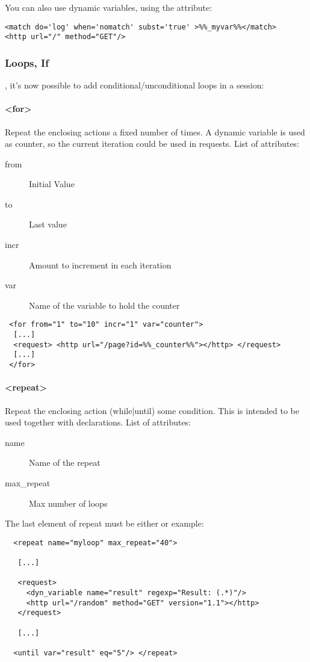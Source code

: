 \documentclass{TSUNG-en}
\begin{document}
You can also use dynamic variables, using the  attribute:
\begin{Verbatim}
<match do='log' when='nomatch' subst='true' >%%_myvar%%</match>
<http url="/" method="GET"/>
\end{Verbatim}

\subsubsection{Loops, If}

, it's now possible to add conditional/unconditional loops in a session:

\paragraph{<for>}


Repeat the enclosing actions a fixed number of times. A dynamic
variable is used as counter, so the current iteration could be used in
requests. List of attributes:

\begin{description}
\item[from] Initial Value
\item[to]   Last value
\item[incr] Amount to increment in each iteration
\item[var]  Name of the variable to hold the counter
\end{description}

\begin{Verbatim}
 <for from="1" to="10" incr="1" var="counter">
  [...]
  <request> <http url="/page?id=%%_counter%%"></http> </request>
  [...]
 </for>
\end{Verbatim}

\paragraph{<repeat>}
Repeat the enclosing action (while|until) some condition. This is
intended to be used together with  declarations. List of
attributes:

\begin{description}
\item[name] Name of the repeat
\item[max\_repeat] Max number of loops
\end{description}

The last element of repeat must be either  or  example:
\begin{Verbatim}
  <repeat name="myloop" max_repeat="40">

   [...]

   <request>
     <dyn_variable name="result" regexp="Result: (.*)"/>
     <http url="/random" method="GET" version="1.1"></http>
   </request>

   [...]

  <until var="result" eq="5"/> </repeat>
\end{Verbatim}
\end{document}
